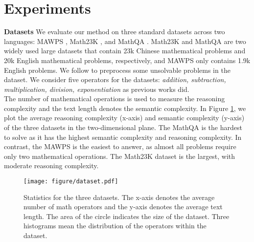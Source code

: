 \documentclass[11pt]{article}
\begin{document}
\section{Experiments}
\textbf{Datasets} We evaluate our method on three standard datasets across two languages: MAWPS \citep{koncel2016mawps}, Math23K \citep{wang2017deep}, and MathQA \citep{amini-etal-2019-mathqa}. Math23K and MathQA are two widely used large datasets that contain 23k Chinese mathematical problems and 20k English mathematical problems, respectively, and MAWPS only contains 1.9k English problems. We follow \citep{tan2021investigating,jie2022learning} to preprocess some unsolvable problems in the dataset. We consider five operators for the datasets: \emph{addition, subtraction, multiplication,  division, exponentiation} as previous works did.\\ 
\indent The number of mathematical operations is used to measure the reasoning complexity and the text length denotes the semantic complexity. In Figure \ref{Fig.dataset}, we plot the average reasoning complexity (x-axis) and semantic complexity (y-axis) of the three datasets in the two-dimensional plane. The MathQA is the hardest to solve as it has the highest semantic complexity and reasoning complexity. In contrast, the MAWPS is the easiest to answer, as almost all problems require only two mathematical operations. The Math23K dataset is the largest, with moderate reasoning complexity.\\
\begin{figure}[t] \centering \texttt{[image: figure/dataset.pdf]} \caption{Statistics for the three datasets. The x-axis denotes the average number of math operators and the y-axis denotes the average text length. The area of the circle indicates the size of the dataset. Three histograms mean the distribution of the operators within the dataset.} \label{Fig.dataset} \end{figure}
\end{document}
